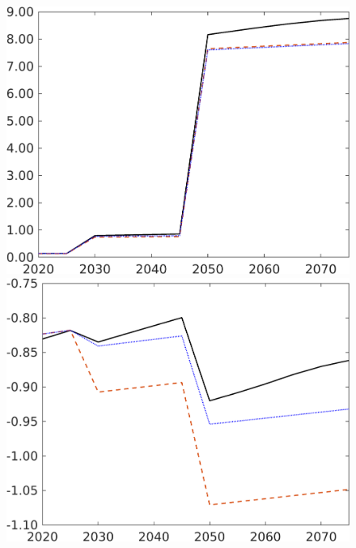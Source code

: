 \begin{figure}[h!!]
\begin{minipage}[]{0.32\textwidth}
	\end{minipage}
	\begin{minipage}[]{0.32\textwidth}
		\includegraphics[width=1\textwidth]{../../codding_model/own_basedOnFried/optimalPol_190722_tidiedUp/figures/all_July22/GFF_CompEffOPT_T_NoTaus_bb3_pol4_spillover0_noskill0_sep1_xgrowth0_etaa0.79_lgd0_lff0.png}
	\end{minipage}
	\begin{minipage}[]{0.32\textwidth}
		\includegraphics[width=1\textwidth]{../../codding_model/own_basedOnFried/optimalPol_190722_tidiedUp/figures/all_July22/SWF_CompEffOPT_T_NoTaus_bb3_pol4_spillover0_noskill0_sep1_xgrowth0_etaa0.79_lgd0_lff0.png}
	\end{minipage}
\end{figure}

